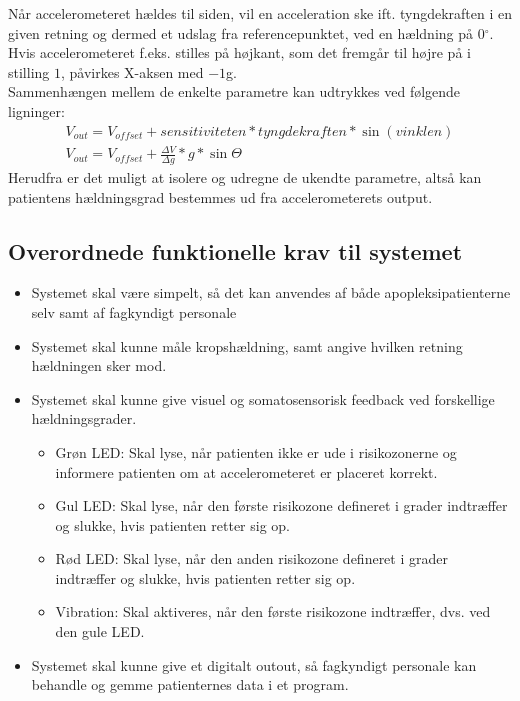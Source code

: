 Når accelerometeret hældes til siden, vil en acceleration ske ift. tyngdekraften i en given retning og dermed et udslag fra referencepunktet, ved en hældning på 0$^{\circ}$. Hvis accelerometeret f.eks. stilles på højkant, som det fremgår til højre på  i stilling $1$, påvirkes X-aksen med $-1$g.\cite{Devices2009} \\
Sammenhængen mellem de enkelte parametre kan udtrykkes ved følgende ligninger: 
\begin{align}
	V_{out} = V_{offset} + sensitiviteten * tyngdekraften * \sin(vinklen) \\
	V_{out} = V_{offset} + \frac{\Delta V}{\Delta g} * g * \sin \Theta
\end{align}
Herudfra er det muligt at isolere og udregne de ukendte parametre, altså kan patientens hældningsgrad bestemmes ud fra accelerometerets output.

\subsection{Overordnede funktionelle krav til systemet}\label{FunkKrav}
\begin{itemize}
	\item Systemet skal være simpelt, så det kan anvendes af både apopleksipatienterne selv samt af fagkyndigt personale
	\item Systemet skal kunne måle kropshældning, samt angive hvilken retning hældningen sker mod. 
	\item Systemet skal kunne give visuel og somatosensorisk feedback ved forskellige hældningsgrader.
	\begin{itemize}
		\item Grøn LED: Skal lyse, når patienten ikke er ude i risikozonerne og informere patienten om at accelerometeret er placeret korrekt.  
		\item Gul LED: Skal lyse, når den første risikozone defineret i grader indtræffer og slukke, hvis patienten retter sig op.
		\item Rød LED: Skal lyse, når den anden risikozone defineret i grader indtræffer og slukke, hvis patienten retter sig op.
		\item Vibration: Skal aktiveres, når den første risikozone indtræffer, dvs. ved den gule LED.
	\end{itemize}
	\item Systemet skal kunne give et digitalt outout, så fagkyndigt personale kan behandle og gemme patienternes data i et program.
\end{itemize}

